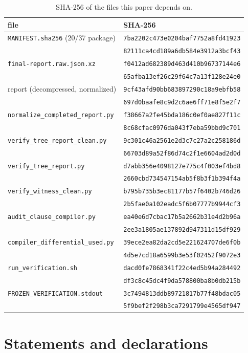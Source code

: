 \documentclass{amsart}
\theoremstyle{definition}
\theoremstyle{plain}
\numberwithin{equation}{section}
\numberwithin{table}{section}
\newcommand{\shaManifestI}{7ba2202c473e0204baf7752a8fd41923}
\newcommand{\shaManifestII}{82111ca4cd189a6db584e3912a3bcf43}
\newcommand{\shaReportXzI}{f0412ad682389d463d410b96737144e6}
\newcommand{\shaReportXzII}{65afba13ef26c29f64c7a13f128e24e0}
\newcommand{\shaReportI}{9cf43afd90bb683897290c18a9ebfb58}
\newcommand{\shaReportII}{697d0baafe8c9d2c6ae6ff71e8f5e2f7}
\newcommand{\shaNormI}{f38667a2fe45bda186c0ef0ae827f11c}
\newcommand{\shaNormII}{8c68cfac0976da043f7eba59bbd9c701}
\newcommand{\shaCleanI}{9c301c46a2561e2d3c7c27a2c258186d}
\newcommand{\shaCleanII}{66703d89a52f86d74c2f1e6604ad2d0d}
\newcommand{\shaTreeI}{d7abb356e4098127e775c4f003ef4bd8}
\newcommand{\shaTreeII}{2660cbd734547154ab5f8b3f1b394f4a}
\newcommand{\shaWitI}{b795b735b3ec81177b57f6402b746d26}
\newcommand{\shaWitII}{2b5fae0a102eadc5f6b07777b9944cf3}
\newcommand{\shaDiffI}{39ece2ea82da2cd5e221624707de6f0b}
\newcommand{\shaDiffII}{4d5e7cd18a6599b3e53f02452f9072e3}
\newcommand{\shaAuditI}{ea40e6d7cbac17b5a2662b31e4d2b96a}
\newcommand{\shaAuditII}{2ee3a1805ae137892d947311d15df929}
\newcommand{\shaRunI}{dacd0fe7868341f22c4ed5b94a284492}
\newcommand{\shaRunII}{df3c8c45dc4f9da578800ba8b0db215b}
\newcommand{\shaStdoutI}{3c7494813ddb89721817b77f48bdac05}
\newcommand{\shaStdoutII}{5f9bef2f298b3ca7291799e4565df947}
\begin{document}
\begin{table}[ht]
\centering\small
\caption{SHA-256 of the files this paper depends on.}\label{tab:sha}
\begin{tabular}{@{}>{\raggedright\arraybackslash}p{}@{\quad}l@{}}
\hline file & SHA-256\\\hline
\texttt{MANIFEST.sha256} (20/37 package) & \texttt{\shaManifestI}\\
 & \texttt{\shaManifestII}\\
\texttt{final-report.raw.json.xz} & \texttt{\shaReportXzI}\\
 & \texttt{\shaReportXzII}\\
report (decompressed, normalized) & \texttt{\shaReportI}\\
 & \texttt{\shaReportII}\\
\texttt{normalize\_completed\_report.py} & \texttt{\shaNormI}\\
 & \texttt{\shaNormII}\\
\texttt{verify\_tree\_report\_clean.py} & \texttt{\shaCleanI}\\
 & \texttt{\shaCleanII}\\
\texttt{verify\_tree\_report.py} & \texttt{\shaTreeI}\\
 & \texttt{\shaTreeII}\\
\texttt{verify\_witness\_clean.py} & \texttt{\shaWitI}\\
 & \texttt{\shaWitII}\\
\texttt{audit\_clause\_compiler.py} & \texttt{\shaAuditI}\\
 & \texttt{\shaAuditII}\\
\texttt{compiler\_differential\_used.py} & \texttt{\shaDiffI}\\
 & \texttt{\shaDiffII}\\
\texttt{run\_verification.sh} & \texttt{\shaRunI}\\
 & \texttt{\shaRunII}\\
\texttt{FROZEN\_VERIFICATION.stdout} & \texttt{\shaStdoutI}\\
 & \texttt{\shaStdoutII}\\
\hline
\end{tabular}
\end{table}
\clearpage



\section*{Statements and declarations}
\end{document}
